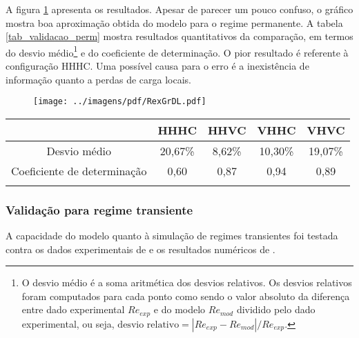 \documentclass[a4paper,portuguese,10pt]{article}
\begin{document}
A figura \ref{fig_validacao_perm} apresenta os resultados. Apesar de parecer um pouco confuso, o gráfico mostra boa aproximação obtida do modelo para o regime permanente. A tabela \ref{tab_validacao_perm} mostra resultados quantitativos da comparação, em termos do desvio médio\footnote{O desvio médio é a soma aritmética dos desvios relativos. Os desvios relativos foram computados para cada ponto como sendo o valor absoluto da diferença entre dado experimental $Re_{exp}$ e do modelo $Re_{mod}$ dividido pelo dado experimental, ou seja, $\text{desvio relativo} = |Re_{exp}-Re_{mod}|/Re_{exp}$.} e do coeficiente de determinação. O pior resultado é referente à configuração HHHC. Uma possível causa para o erro é a inexistência de informação quanto a perdas de carga locais.

\begin{figure}
  \begin{center}
    \texttt{[image: ../imagens/pdf/RexGrDL.pdf]}
    \vspace*{-20mm}
    \label{fig_validacao_perm}
  \end{center}
\end{figure}

\begin{center}
  \begin{tabular}{ccccc}
    \hline
    & HHHC & HHVC & VHHC & VHVC\\
    \hline
    Desvio médio  & 20,67\% & 8,62\% & 10,30\% & 19,07\%\\
    Coeficiente de determinação & 0,60 & 0,87 & 0,94 & 0,89\\
    \hline\\
  \end{tabular}
  \label{tab_validacao_perm}
\end{center}

\subsubsection{Validação para regime transiente}

A capacidade do modelo quanto à simulação de regimes transientes foi testada contra os dados experimentais de \citet{VIJAYAN94} e os resultados numéricos de \citet{AMBROSINI04}. 
\end{document}
